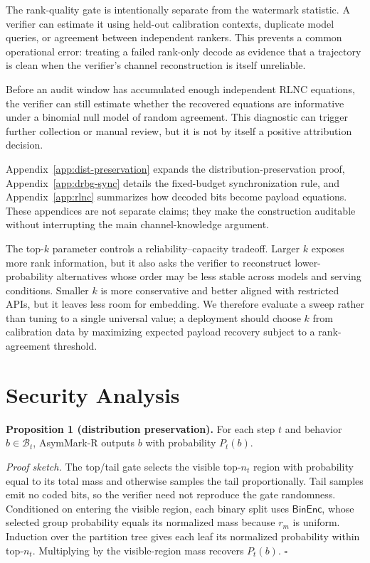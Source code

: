 \documentclass[conference,compsoc]{IEEEtran}
\newcommand{\ours}{AsymMark-R}
\newcommand{\BinEnc}{\ensuremath{\mathsf{BinEnc}}}
\newcommand{\B}{\mathcal{B}}
\begin{document}
The rank-quality gate is intentionally separate from the watermark statistic. A verifier can estimate it using held-out calibration contexts, duplicate model queries, or agreement between independent rankers. This prevents a common operational error: treating a failed rank-only decode as evidence that a trajectory is clean when the verifier's channel reconstruction is itself unreliable.

Before an audit window has accumulated enough independent RLNC equations, the verifier can still estimate whether the recovered equations are informative under a binomial null model of random agreement. This diagnostic can trigger further collection or manual review, but it is not by itself a positive attribution decision.

Appendix~\ref{app:dist-preservation} expands the distribution-preservation proof, Appendix~\ref{app:drbg-sync} details the fixed-budget synchronization rule, and Appendix~\ref{app:rlnc} summarizes how decoded bits become payload equations. These appendices are not separate claims; they make the construction auditable without interrupting the main channel-knowledge argument.

The top-$k$ parameter controls a reliability--capacity tradeoff. Larger $k$ exposes more rank information, but it also asks the verifier to reconstruct lower-probability alternatives whose order may be less stable across models and serving conditions. Smaller $k$ is more conservative and better aligned with restricted APIs, but it leaves less room for embedding. We therefore evaluate a sweep rather than tuning to a single universal value; a deployment should choose $k$ from calibration data by maximizing expected payload recovery subject to a rank-agreement threshold.

\section{Security Analysis}
\label{sec:security}

\textbf{Proposition 1 (distribution preservation).}
For each step $t$ and behavior $b\in\B_t$, \ours{} outputs $b$ with probability $P_t(b)$.

\emph{Proof sketch.}
The top/tail gate selects the visible top-$n_t$ region with probability equal to its total mass and otherwise samples the tail proportionally. Tail samples emit no coded bits, so the verifier need not reproduce the gate randomness. Conditioned on entering the visible region, each binary split uses \BinEnc{}, whose selected group probability equals its normalized mass because $r_m$ is uniform. Induction over the partition tree gives each leaf its normalized probability within top-$n_t$. Multiplying by the visible-region mass recovers $P_t(b)$. \hfill$\square$
\end{document}
